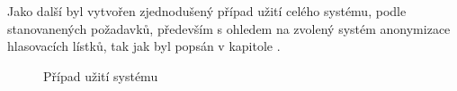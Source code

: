 Jako další byl vytvořen zjednodušený případ užití celého systému, podle stanovanených požadavků, především s ohledem na zvolený systém anonymizace hlasovacích lístků, tak jak byl popsán v kapitole .

\begin{figure}[h]
		\centering \tiny {}\selectfont
		\def\svgwidth{1\columnwidth}
		
		\normalsize \sffamily
		\captionsetup{width=\linewidth}
		\caption{Případ užití systému}
		\label{fig:UseCase}
\end{figure}